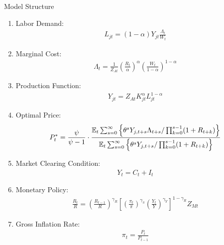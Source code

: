 \documentclass[../quali_slides.tex]{subfiles}
\begin{document}
\begin{frame}[allowframebreaks]{Model Structure}
{\begin{enumerate}
	\item Labor Demand:
	\begin{align}
		L_{jt} = (1-\alpha) Y_{jt} \frac{\Lambda_t}{W_t}
	\end{align}
	
	
	\item Marginal Cost:
	\begin{align}
		\Lambda_t = \frac{1}{Z_{At}} \left( \frac{R_t}{\alpha} \right)^{\alpha} \left( \frac{W_t}{1-\alpha} \right)^{1-\alpha}
	\end{align}
	
	\item Production Function:
	\begin{align}
		Y_{jt} = Z_{At} K_{jt}^\alpha L_{jt}^{1-\alpha}
	\end{align}
	
	\item Optimal Price:
	\begin{align}
		P_t^\ast = \frac{\psi}{\psi-1} \cdot \frac{ \E \sum_{s=0}^{\infty} \left\{ \theta^s Y_{j,t+s} \Lambda_{t+s} / \prod_{k=0}^{s-1}(1+R_{t+k}) \right\} } {\E \sum_{s=0}^{\infty} \left\{ \theta^s Y_{j,t+s} / \prod_{k=0}^{s-1}(1 + R_{t+k}) \right\}} %
	\end{align}
	
	\item Market Clearing Condition:
	\begin{align}
		Y_t = C_t + I_t
	\end{align}
	
	\item Monetary Policy:
	\begin{align}
		\frac{R_t}{R} = \left( 
		\frac{R_{t-1}}{R} \right)^{\gamma_R} \left[ \left(
		\frac{\pi_t}{\pi} \right)^{\gamma_\pi} \left( 
		\frac{Y_t}{Y} \right)^{\gamma_Y} \right]^{1-\gamma_R} Z_{Mt}
	\end{align}
	
	\item Gross Inflation Rate:
	\begin{align}
		\pi_t = \frac{P_t}{P_{t-1}}
	\end{align}
	

\end{enumerate}}
\end{frame}
\end{document}
